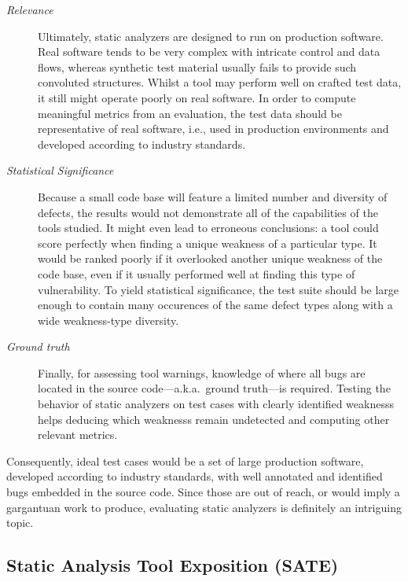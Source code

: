 \vspace{0.3cm}

\begin{description}
    \item [\emph{Relevance}] Ultimately, static analyzers are designed to run on production software. Real software tends to be very complex with intricate control and data flows, whereas synthetic test material usually fails to provide such convoluted structures. Whilst a tool may perform well on crafted test data, it still might operate poorly on real software. In order to compute meaningful metrics from an evaluation, the test data should be representative of real software, i.e., used in production environments and developed according to industry standards.
    \item [\emph{Statistical Significance}] Because a small code base will feature a limited number and diversity of defects, the results would not demonstrate all of the capabilities of the tools studied. It might even lead to erroneous conclusions: a tool could score perfectly when finding a unique \gls{weakness} of a particular type. It would be ranked poorly if it overlooked another unique \gls{weakness} of the code base, even if it usually performed well at finding this type of \gls{vulnerability}. To yield statistical significance, the test suite should be large enough to contain many occurences of the same defect types along with a wide \gls{weakness}-type diversity.
    \item [\emph{Ground truth}] Finally, for assessing tool warnings, knowledge of where all bugs are located in the source code---a.k.a.\ ground truth---is required. Testing the behavior of static analyzers on test cases with clearly identified \glspl{weakness} helps deducing which \glspl{weakness} remain undetected and computing other relevant metrics.
\end{description}

\vspace{0.3cm}

Consequently, ideal test cases would be a set of large production software, developed according to industry standards, with well annotated and identified bugs embedded in the source code. Since those are out of reach, or would imply a gargantuan work to produce, evaluating static analyzers is definitely an intriguing topic.

\clearpage

\subsection{Static Analysis Tool Exposition (SATE)}

